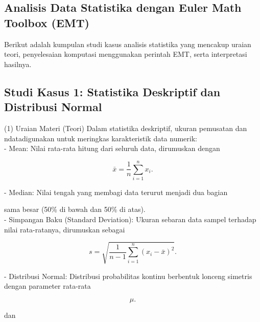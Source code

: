 \documentclass{article}
\newenvironment{eulernotebook}{\par}{\par}
\newcommand{\eulersubheading}[1]{\subsection{#1}}
\newenvironment{eulercomment}{\par\medskip}{\par\medskip}
\newenvironment{eulerformula}{}{}
\begin{document}
\begin{eulernotebook}
\begin{eulercomment}
\begin{eulercomment}
\begin{eulercomment}
\begin{eulercomment}
\begin{eulercomment}
\begin{eulercomment}
\begin{eulerprompt}
\end{eulerprompt}
\begin{euleroutput}
  [0.43702,  0.20672,  0.46615,  0.28477,  0.20835]
\end{euleroutput}
\eulersubheading{Analisis Data Statistika dengan Euler Math Toolbox (EMT)}
\begin{eulercomment}
Berikut adalah kumpulan studi kasus analisis statistika yang mencakup
uraian teori, penyelesaian komputasi menggunakan perintah EMT, serta
interpretasi hasilnya.

\end{eulercomment}
\eulersubheading{Studi Kasus 1: Statistika Deskriptif dan Distribusi Normal}
\begin{eulercomment}
(1) Uraian Materi (Teori) Dalam statistika deskriptif, ukuran
pemusatan dan ndatadigunakan untuk meringkas karakteristik data
numerik:\\
- Mean: Nilai rata-rata hitung dari seluruh data, dirumuskan dengan\\
\end{eulercomment}
\begin{eulerformula}
\[
\bar{x} = \frac{1}{n}\sum_{i=1}^{n} x_i.
\]
\end{eulerformula}
\begin{eulerttcomment}
 - Median: Nilai tengah yang membagi data terurut menjadi dua bagian
\end{eulerttcomment}
\begin{eulercomment}
sama besar (50\% di bawah dan 50\% di atas).\\
- Simpangan Baku (Standard Deviation): Ukuran sebaran data sampel
terhadap nilai rata-ratanya, dirumuskan sebagai\\
\end{eulercomment}
\begin{eulerformula}
\[
s = \sqrt{\frac{1}{n-1}\sum_{i=1}^{n} (x_i - \bar{x})^2}.
\]
\end{eulerformula}
\begin{eulercomment}
- Distribusi Normal: Distribusi probabilitas kontinu berbentuk lonceng
simetris dengan parameter rata-rata\\
\end{eulercomment}
\begin{eulerformula}
\[
\mu.
\]
\end{eulerformula}
\begin{eulercomment}
dan\\
\end{eulercomment}
\begin{eulerformula}

\end{eulerformula}
\end{eulercomment}
\end{eulercomment}
\end{eulercomment}
\end{eulercomment}
\end{eulercomment}
\end{eulercomment}
\end{eulernotebook}
\end{document}
